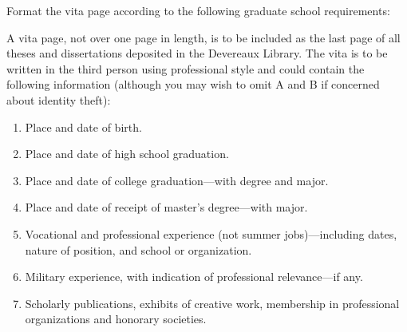 \documentclass[12pt]{thesis}
\begin{document}

\begin{vita}

  
  Format the vita page according to the following graduate school requirements:

A vita page, not over one page in length, is to be included as the
last page of all theses and dissertations deposited in the Devereaux
Library. The vita is to be written in the third person using
professional style and could contain the following information
(although you may wish to omit A and B if concerned about identity
theft):
\begin{enumerate}[label=\Alph*.]
\item Place and date of birth.

\item Place and date of high school graduation.

\item Place and date of college graduation—with degree and major.

\item Place and date of receipt of master’s degree—with major.

\item Vocational and professional experience (not summer jobs)—including dates, nature of position, and school or organization.

\item Military experience, with indication of professional relevance—if any.

\item Scholarly publications, exhibits of creative work, membership in professional organizations and honorary societies.
\end{enumerate}
  

\end{vita}
\end{document}
